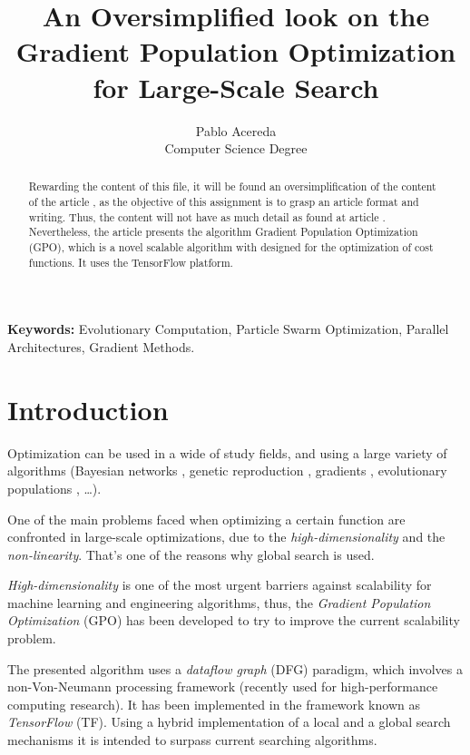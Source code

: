 \documentclass[10pt]{article}
\title{
An Oversimplified look on the Gradient Population Optimization for Large-Scale 
Search
}
\author{
Pablo Acereda\\
Computer Science Degree\\
}
\begin{document}
\maketitle

\begin{abstract}

Rewarding the content of this file, it will be found an oversimplification of
the content of the article \cite{artgpo}, as the objective of
this assignment is to grasp an article format and writing. Thus, the content
will not have as much detail as found at article \cite{artgpo}. Nevertheless,
the article presents the algorithm Gradient Population Optimization (GPO), which
is a novel scalable algorithm with designed for the optimization of cost
functions. It uses the TensorFlow platform.

\end{abstract}

{\bf Keywords:}
    Evolutionary Computation,
    Particle Swarm Optimization,
    Parallel Architectures,
    Gradient Methods.

\section{Introduction}

Optimization can be used in a wide of study fields, and using a large variety of 
algorithms (Bayesian networks \cite{hierarchical}, genetic reproduction
\cite{russellnorvig}, gradients \cite{gradientanalysis}, evolutionary
populations \cite{particleswarm}, \ldots).

One of the main problems faced when optimizing a certain function are confronted
in large-scale optimizations, due to the \emph{high-dimensionality} and the
\emph{non-linearity}. That's one of the reasons why global search is used. 

\emph{High-dimensionality} is one of the most urgent barriers against
scalability for machine learning and engineering algorithms, thus, the
\emph{Gradient Population Optimization} (GPO) has been developed to try to
improve the current scalability problem.

The presented algorithm uses a \emph{dataflow graph} (DFG) paradigm, which
involves a non-Von-Neumann processing framework (recently used for
high-performance computing research). It has been implemented in the framework
known as \emph{TensorFlow} (TF). Using a hybrid implementation of a local and a
global search mechanisms it is intended to surpass current searching algorithms. 
\end{document}
